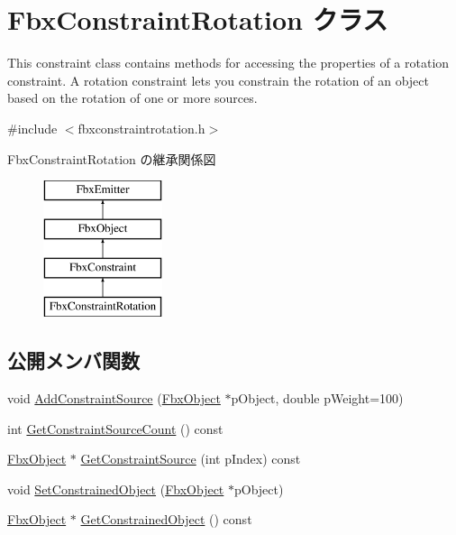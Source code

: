 \hypertarget{class_fbx_constraint_rotation}{}\section{Fbx\+Constraint\+Rotation クラス}
\label{class_fbx_constraint_rotation}


This constraint class contains methods for accessing the properties of a rotation constraint. A rotation constraint lets you constrain the rotation of an object based on the rotation of one or more sources.  




{\ttfamily \#include $<$fbxconstraintrotation.\+h$>$}

Fbx\+Constraint\+Rotation の継承関係図\begin{figure}[H]
\begin{center}
\leavevmode
\includegraphics[height=4.000000cm]{class_fbx_constraint_rotation}
\end{center}
\end{figure}
\subsection*{公開メンバ関数}
\begin{DoxyCompactItemize}
\item 
void \hyperlink{class_fbx_constraint_rotation_ac025636c53dc8316f7da590de99bdb20}{Add\+Constraint\+Source} (\hyperlink{class_fbx_object}{Fbx\+Object} $\ast$p\+Object, double p\+Weight=100)
\item 
int \hyperlink{class_fbx_constraint_rotation_ab27178d5b53654eb9f41f6e3f3a4c5dc}{Get\+Constraint\+Source\+Count} () const
\item 
\hyperlink{class_fbx_object}{Fbx\+Object} $\ast$ \hyperlink{class_fbx_constraint_rotation_a4bfb008520cb5aa6996104c292e5819e}{Get\+Constraint\+Source} (int p\+Index) const
\item 
void \hyperlink{class_fbx_constraint_rotation_ae7d40f146877a4defd18cd41692fa78e}{Set\+Constrained\+Object} (\hyperlink{class_fbx_object}{Fbx\+Object} $\ast$p\+Object)
\item 
\hyperlink{class_fbx_object}{Fbx\+Object} $\ast$ \hyperlink{class_fbx_constraint_rotation_ad9bdaf083716c730fdd907a9387e4991}{Get\+Constrained\+Object} () const
\end{DoxyCompactItemize}
